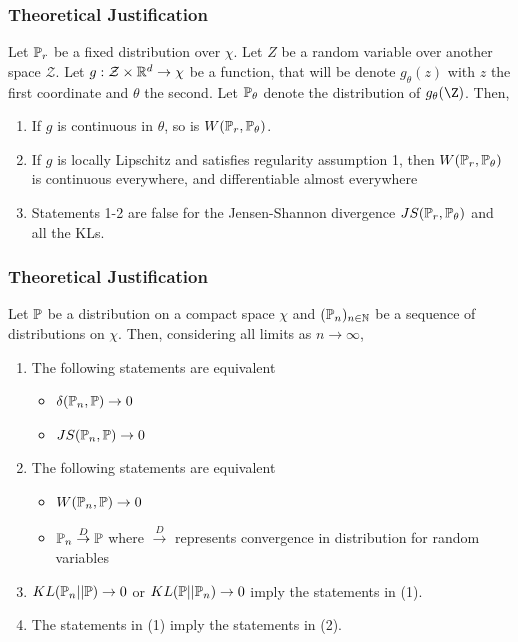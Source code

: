 \documentclass{beamer}
\begin{document}
\begin{frame}
\frametitle{Theoretical Justification}
\begin{Theorem}[1]
Let $\P_{r}$ be a fixed distribution over $\chi$. Let $Z$ be a random variable over another space $\mathcal{Z}$. Let $g: \mathcal{Z} \times \R^{d} \to \chi$ be a function, that will be denote $g_{\theta}(z)$ with $z$ the first coordinate and $\theta$ the second. Let $\P_{\theta}$ denote the distribution of $g_{\theta}(\Z)$. Then,
\begin{enumerate}
\item{If $g$ is continuous in $\theta$, so is $W(\P_{r},\P_{\theta})$.}
\item{If $g$ is locally Lipschitz and satisfies regularity assumption 1, then $W(\P_{r},\P_{\theta})$ is continuous everywhere, and differentiable almost everywhere}
\item{Statements 1-2 are false for the Jensen-Shannon divergence $JS(\P_{r}, \P_{\theta})$ and all the KLs.}
\end{enumerate}
\end{Theorem}
\end{frame}

\begin{frame}
\frametitle{Theoretical Justification}



\begin{Theorem}[2]
Let $\P$ be a distribution on a compact space $\chi$ and $(\P_{n})_{n \in \N}$ be a sequence of distributions on $\chi$. Then, considering all limits as $n \to \infty$,
\begin{enumerate}
\item{The following statements are equivalent
\begin{itemize}
\item{$\delta(\P_{n}, \P) \to 0$}
\item{$JS(\P_{n}, \P) \to 0$}
\end{itemize}
}
\item{The following statements are equivalent
\begin{itemize}
\item{$W(\P_{n}, \P) \to 0$}
\item{$\P_{n} \overset{D}{\to} \P$ where $\overset{D}{\to}$ represents convergence in distribution for random variables}
\end{itemize}
}
\item{$KL(\P_{n}||\P) \to 0$ or $KL(\P||\P_{n}) \to 0$ imply the statements in (1).}
\item{The statements in (1) imply the statements in (2).}
\end{enumerate}
\end{Theorem}
\end{frame}
\end{document}
